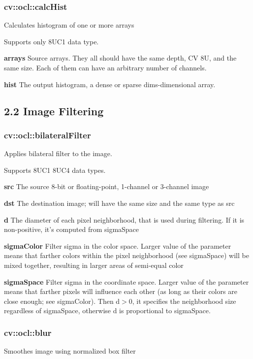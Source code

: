 \documentclass{article}
\begin{document}
\subsubsection{cv::ocl::calcHist }
\label{subsubsec:mylabel30}
Calculates histogram of one or more arrays

Supports only 8UC1 data type.

\textbf{arrays }Source arrays. They all should have the same depth, CV 8U,
and the same size. Each of them can have an arbitrary number of channels.

\textbf{hist }The output histogram, a dense or sparse dims-dimensional
array.

\newpage

\subsection{2.2 Image Filtering}
\label{subsec:mylabel4}
\subsubsection{cv::ocl::bilateralFilter}
\label{subsubsec:mylabel31}
Applies bilateral filter to the image.

Supports 8UC1 8UC4 data types.

\textbf{src }The source 8-bit or floating-point, 1-channel or 3-channel
image

\textbf{dst }The destination image; will have the same size and the same
type as src

\textbf{d }The diameter of each pixel neighborhood, that is used during
filtering. If it is non-positive, it's computed from sigmaSpace

\textbf{sigmaColor }Filter sigma in the color space. Larger value of the
parameter means that farther colors within the pixel neighborhood (see
sigmaSpace) will be mixed together, resulting in larger areas of semi-equal
color

\textbf{sigmaSpace }Filter sigma in the coordinate space. Larger value of
the parameter means that farther pixels will influence each other (as long
as their colors are close enough; see sigmaColor). Then d$>$0, it specifies
the neighborhood size regardless of sigmaSpace, otherwise d is proportional
to sigmaSpace.

\newpage

\subsubsection{cv::ocl::blur }
\label{subsubsec:mylabel32}
Smoothes image using normalized box filter
\end{document}
